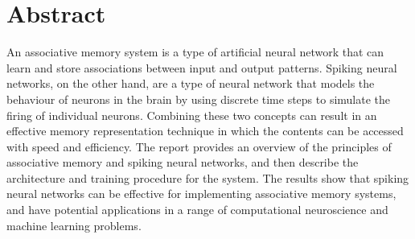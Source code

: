 \chapter*{\centering Abstract}%
\begin{center}
\end{center}

An associative memory system is a type of artificial neural network that can
learn and store associations between input and output patterns. Spiking neural
networks, on the other hand, are a type of neural network that models the
behaviour of neurons in the brain by using discrete time steps to simulate the
firing of individual neurons. Combining these two concepts can result in an
effective memory representation technique in which the contents can be accessed
with speed and efficiency. The report provides an overview of the principles of
associative memory and spiking neural networks, and then describe the
architecture and training procedure for the system. The results show that
spiking neural networks can be effective for implementing associative memory
systems, and have potential applications in a range of computational
neuroscience and machine learning problems.

\begin{flushright}

\end{flushright}

\thispagestyle{plain}